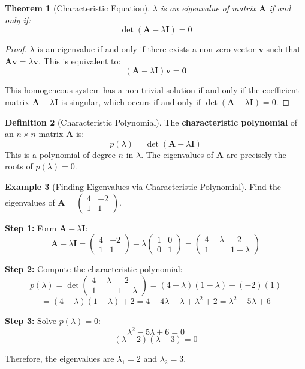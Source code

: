 \documentclass[12pt]{article}
\numberwithin{equation}{section}
\newcommand{\vect}[1]{\boldsymbol{#1}}   %
\newcommand{\mat}[1]{\mathbf{#1}}        %
\theoremstyle{plain}
\newtheorem{theorem}{Theorem}[section]
\theoremstyle{definition}
\newtheorem{definition}[theorem]{Definition}
\newtheorem{example}[theorem]{Example}
\theoremstyle{remark}
\begin{document}
\begin{theorem}[Characteristic Equation]
$\lambda$ is an eigenvalue of matrix $\mat{A}$ if and only if:
$$\det(\mat{A} - \lambda\mat{I}) = 0$$
\end{theorem}

\begin{proof}
$\lambda$ is an eigenvalue if and only if there exists a non-zero vector $\vect{v}$ such that $\mat{A}\vect{v} = \lambda\vect{v}$. This is equivalent to:
$$(\mat{A} - \lambda\mat{I})\vect{v} = \vect{0}$$

This homogeneous system has a non-trivial solution if and only if the coefficient matrix $\mat{A} - \lambda\mat{I}$ is singular, which occurs if and only if $\det(\mat{A} - \lambda\mat{I}) = 0$.
\end{proof}

\begin{definition}[Characteristic Polynomial]
The \textbf{characteristic polynomial} of an $n \times n$ matrix $\mat{A}$ is:
$$p(\lambda) = \det(\mat{A} - \lambda\mat{I})$$
This is a polynomial of degree $n$ in $\lambda$. The eigenvalues of $\mat{A}$ are precisely the roots of $p(\lambda) = 0$.
\end{definition}

\begin{example}[Finding Eigenvalues via Characteristic Polynomial]
Find the eigenvalues of $\mat{A} = \begin{pmatrix} 4 & -2 \\ 1 & 1 \end{pmatrix}$.

\textbf{Step 1:} Form $\mat{A} - \lambda\mat{I}$:
$$\mat{A} - \lambda\mat{I} = \begin{pmatrix} 4 & -2 \\ 1 & 1 \end{pmatrix} - \lambda\begin{pmatrix} 1 & 0 \\ 0 & 1 \end{pmatrix} = \begin{pmatrix} 4-\lambda & -2 \\ 1 & 1-\lambda \end{pmatrix}$$

\textbf{Step 2:} Compute the characteristic polynomial:
$$p(\lambda) = \det\begin{pmatrix} 4-\lambda & -2 \\ 1 & 1-\lambda \end{pmatrix} = (4-\lambda)(1-\lambda) - (-2)(1)$$
$$= (4-\lambda)(1-\lambda) + 2 = 4 - 4\lambda - \lambda + \lambda^2 + 2 = \lambda^2 - 5\lambda + 6$$

\textbf{Step 3:} Solve $p(\lambda) = 0$:
$$\lambda^2 - 5\lambda + 6 = 0$$
$$(\lambda - 2)(\lambda - 3) = 0$$

Therefore, the eigenvalues are $\lambda_1 = 2$ and $\lambda_2 = 3$.
\end{example}
\end{document}
